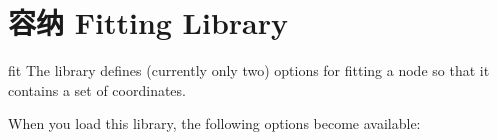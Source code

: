 %
%
%


\section{容纳 Fitting Library}
\label{section-library-fit}

\begin{tikzlibrary}{fit}
    The library defines (currently only two) options for fitting a node so that
    it contains a set of coordinates.
\end{tikzlibrary}

When you load this library, the following options become available:

